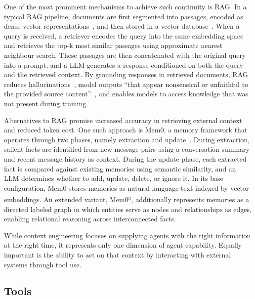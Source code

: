 \documentclass[
english,                 %
bibtex,                  %
includeExtraAbstracts, %
]{kththesis}
\numberwithin{listing}{chapter}
\begin{document}
One of the most prominent mechanisms to achieve such continuity is \gls{RAG}. In a typical \gls{RAG} pipeline, documents are first segmented into passages, encoded as dense vector representations~\cite{fan_survey_2024}, and then stored in a vector database~\cite{ramos_review_2025}. When a query is received, a retriever encodes the query into the same embedding space and retrieves the top-k most similar passages using approximate nearest neighbour search. These passages are then concatenated with the original query into a prompt, and a \gls{LLM} generates a response conditioned on both the query and the retrieved context. By grounding responses in retrieved documents, \gls{RAG} reduces hallucinations~\cite{shuster_retrieval_2021}, model outputs ``that appear nonsensical or unfaithful to the provided source content''~\cite{huang_survey_2025}, and enables models to access knowledge that was not present during training.

Alternatives to \gls{RAG} promise increased accuracy in retrieving external context and reduced token cost. One such approach is Mem0, a memory framework that operates through two phases, namely extraction and update~\cite{chhikara_mem0_2025}. During extraction, salient facts are identified from new message pairs using a conversation summary and recent message history as context. During the update phase, each extracted fact is compared against existing memories using semantic similarity, and an \gls{LLM} determines whether to add, update, delete, or ignore it. In its base configuration, Mem0 stores memories as natural language text indexed by vector embeddings. An extended variant, Mem0\textsuperscript{g}, additionally represents memories as a directed labeled graph in which entities serve as nodes and relationships as edges, enabling relational reasoning across interconnected facts.

While context engineering focuses on supplying agents with the right information at the right time, it represents only one dimension of agent capability. Equally important is the ability to act on that context by interacting with external systems through tool use.

\subsection{Tools}
\end{document}

